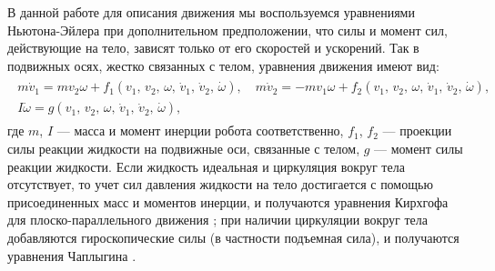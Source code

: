 В данной работе для описания движения мы воспользуемся уравнениями Ньютона-Эйлера при дополнительном предположении, что силы и момент сил, действующие на тело, зависят только от его скоростей и ускорений. Так в подвижных осях, жестко связанных с телом, уравнения движения имеют вид:
\begin{gather}
\begin{gathered}
m \dot{v}_1 = m v_2 \omega + f_1 (v_1,\, v_2,\, \omega,\, \dot{v}_1,\, \dot{v}_2,\, \dot \omega),\quad m \dot{v}_2 = -m v_1 \omega + f_2 (v_1,\, v_2,\, \omega,\, \dot{v}_1,\, \dot{v}_2,\, \dot \omega),\\
I \dot{\omega} = g (v_1,\, v_2,\, \omega,\, \dot{v}_1,\, \dot{v}_2,\, \dot \omega),
\end{gathered}\label{eq.NE}
\end{gather}
где $m$, $I$ --- масса и момент инерции робота соответственно, $f_1$, $f_2$ --- проекции силы реакции жидкости на подвижные оси, связанные с телом, $g$ --- момент силы реакции жидкости. Если жидкость идеальная и циркуляция вокруг тела отсутствует, то учет сил давления жидкости на тело достигается с помощью присоединенных масс и моментов инерции, и получаются уравнения Кирхгофа для плоско-параллельного движения \cite{Kirchhoff_1869}; при наличии циркуляции вокруг тела добавляются гироскопические силы (в частности подъемная сила), и получаются уравнения Чаплыгина \cite{Chaplygin, Borisov_Mamaev_2006}. 

